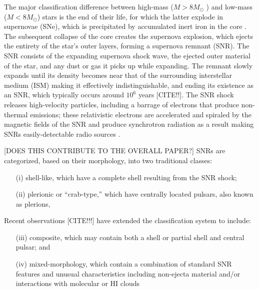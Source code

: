 \documentclass[preprint2,epsf,epsfig,graphics]{emulateapj}
\begin{document}
The major classification difference between high-mass ($M > 8M_{\odot}$ ) and low-mass ($M < 8 M_\odot$) stars is the end of their life, for which the latter explode in supernovae (SNe), which is precipitated by accumulated inert iron in the core \citep{Arnett.73}.  
The subsequent collapse of the core creates the supernova explosion, which ejects the entirety of the star’s outer layers, forming a supernova remnant (SNR).  The SNR consists of the expanding supernova shock wave, the ejected outer material of the star, and any dust or gas it picks up while expanding.  
The remnant slowly expands until its density becomes near that of the surrounding interstellar medium (ISM) making it effectively indistinguishable, and ending its existence as an SNR, which typically occurs around $10^6$ years [{\color{red}CITE!!}].  
The SNR shock releases high-velocity particles, including a barrage of electrons that produce non-thermal emissions; these relativistic electrons are accelerated and spiraled by the magnetic fields of the SNR and produce synchrotron radiation as a result making SNRs easily-detectable radio sources \citep[e.g.][]{Burbidge.56,Stupar_cat.11}.

{\color{red}[DOES THIS CONTRIBUTE TO THE OVERALL PAPER?]}
SNRs are categorized, based on their morphology, into two traditional classes: 
\begin{itemize}
\item[(i)] shell-like, which have a complete shell resulting from the SNR shock;
\item[(ii)] plerionic or ``crab-type,'' which have centrally located pulsars, also known as plerions, \citep{Weiler_crab.78}
\end{itemize} 
Recent observations {\color{red}[CITE!!!]} have extended the classification system to include: 
\begin{itemize}
\item[(iii)] composite, which may contain both a shell or partial shell and central pulsar; and
\item[(iv)] mixed-morphology, which contain a combination of standard SNR features and unusual characteristics including non-ejecta material and/or interactions with molecular or HI clouds \citep{Rho.98}
\end{itemize}
\end{document}
